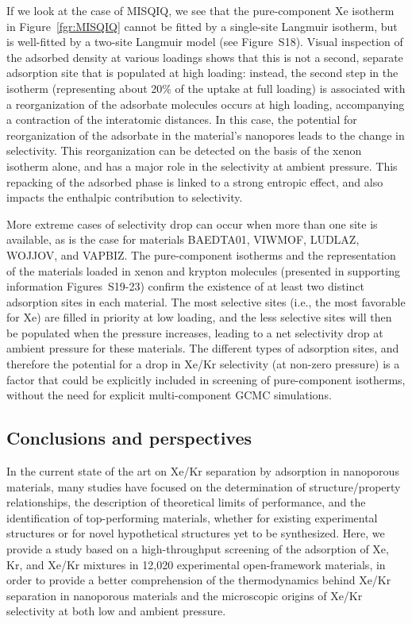 \documentclass[main.tex]{subfiles}
\begin{document}
  If we look at the case of MISQIQ, we see that the pure-component Xe isotherm in Figure~\ref{fgr:MISQIQ} cannot be fitted by a single-site Langmuir isotherm, but is well-fitted by a two-site Langmuir model (see Figure~S18). Visual inspection of the adsorbed density at various loadings shows that this is not a second, separate adsorption site that is populated at high loading: instead, the second step in the isotherm (representing about {20\%} of the uptake at full loading) is associated with a reorganization of the adsorbate molecules occurs at high loading, accompanying a contraction of the interatomic distances. In this case, the potential for reorganization of the adsorbate in the material's nanopores leads to the change in selectivity. This reorganization can be detected on the basis of the xenon isotherm alone, and has a major role in the selectivity at ambient pressure. This repacking of the adsorbed phase is linked to a strong entropic effect, and also impacts the enthalpic contribution to selectivity.
  
  More extreme cases of selectivity drop can occur when more than one site is available, as is the case for materials BAEDTA01, VIWMOF, LUDLAZ, WOJJOV, and VAPBIZ. The pure-component isotherms and the representation of the materials loaded in xenon and krypton molecules (presented in supporting information Figures~S19-23) confirm the existence of at least two distinct adsorption sites in each material. The most selective sites (i.e., the most favorable for Xe) are filled in priority at low loading, and the less selective sites will then be populated when the pressure increases, leading to a net selectivity drop at ambient pressure for these materials. The different types of adsorption sites, and therefore the potential for a drop in Xe/Kr selectivity (at non-zero pressure) is a factor that could be explicitly included in screening of pure-component isotherms, without the need for explicit multi-component GCMC simulations.

  \subsection{Conclusions and perspectives}

  In the current state of the art on Xe/Kr separation by adsorption in nanoporous materials, many studies have focused on the determination of structure/property relationships, the description of theoretical limits of performance, and the identification of top-performing materials, whether for existing experimental structures or for novel hypothetical structures yet to be synthesized. Here, we provide a study based on a high-throughput screening of the adsorption of Xe, Kr, and Xe/Kr mixtures in 12,020 experimental open-framework materials, in order to provide a better comprehension of the thermodynamics behind Xe/Kr separation in nanoporous materials and the microscopic origins of Xe/Kr selectivity at both low and ambient pressure. 
\end{document}
